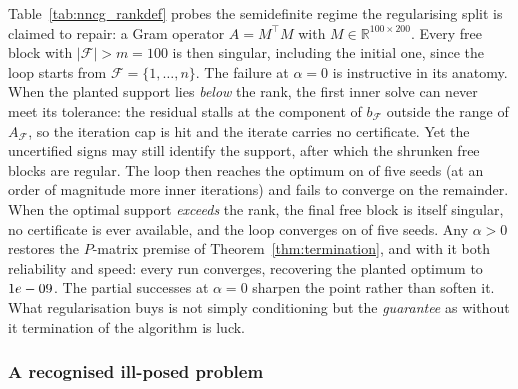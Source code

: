 Table~\ref{tab:nncg_rankdef} probes the semidefinite regime the
regularising split is claimed to repair: a Gram operator $A = M^\top M$ with
$M \in \mathbb{R}^{100\times 200}$. Every free block with $|\mathcal{F}| > m = 100$ is then
singular, including the initial one, since the loop starts from
$\mathcal{F} = \{1,\dots,n\}$. The failure at $\alpha = 0$ is instructive in its anatomy.
When the planted support lies \emph{below} the rank, the first inner solve can never meet its
tolerance: the residual stalls at the component of $b_{\mathcal{F}}$ outside the range of
$A_{\mathcal{F}}$, so the iteration cap is hit and the iterate carries no certificate. Yet
the uncertified signs may still identify the support, after which the shrunken free blocks
are regular. The loop then reaches the optimum on \nncgRankConvLow{} of five seeds (at an
order of magnitude more inner iterations) and fails to converge on the remainder. When the
optimal support \emph{exceeds} the rank, the final free block is itself singular, no
certificate is ever available, and the loop converges on \nncgRankConvHigh{} of five seeds.
Any $\alpha > 0$ restores the $P$-matrix premise of Theorem~\ref{thm:termination}, and with
it both reliability and speed: every run converges, recovering the planted optimum to
$1e-09$. The partial successes at $\alpha = 0$ sharpen the point rather than soften
it. What regularisation buys is not simply conditioning but the \emph{guarantee} as without it termination of the algorithm is luck.

\begin{table}[ht]
\centering
\footnotesize

\caption{The rank-deficient regime ($n = 200$, $m = 100$, five seeds; CG capped at $2000$
iterations per solve, $30$ outer steps). ``Capped solves'' counts runs whose first inner
solve hit the cap without meeting its tolerance. At $\alpha = 0$ the loop is unreliable below
the rank and fails uniformly above it; any $\alpha > 0$ converges on every seed with an order
of magnitude fewer inner iterations.}
\label{tab:nncg_rankdef}
\end{table}

\subsubsection{A recognised ill-posed problem}

